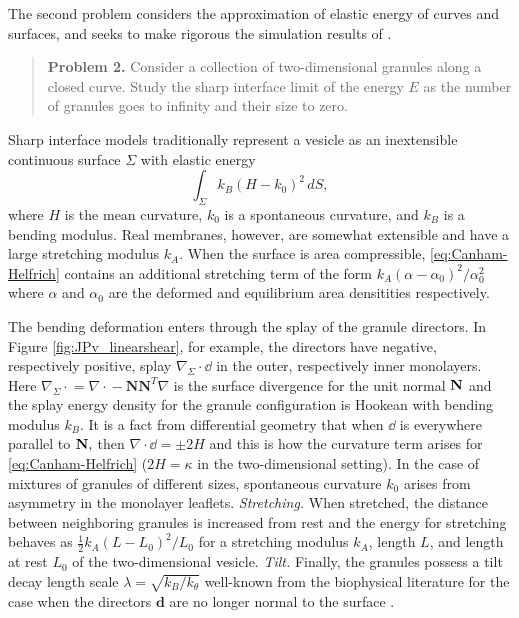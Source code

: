 The second problem considers the approximation
of elastic energy of curves and surfaces,
and seeks to make rigorous the simulation results of
\cite{FuQuRyYo22, Fu2018_SIAM}.
\begin{quotation}
  \textbf{Problem 2.}
  Consider a collection of two-dimensional
  granules along a closed curve. 
  Study the sharp interface limit of the energy $E$ 
  as the number of granules goes to infinity and their size to zero.
\end{quotation}
Sharp interface models
traditionally represent a vesicle as an
inextensible continuous surface $\Sigma$ with elastic energy
\begin{equation}
\label{eq:Canham-Helfrich}
  \int_{\Sigma} k_B(H - k_0)^2\, dS,
\end{equation}
where $H$ is the mean curvature, $k_0$ is a spontaneous curvature,
and $k_B$ is a bending modulus.
Real membranes, however, are somewhat extensible and
have a large stretching modulus $k_A$.
When the surface is area compressible,
\eqref{eq:Canham-Helfrich} contains an additional stretching term of the
form $k_A(\alpha - \alpha_0)^2/\alpha_0^2$ where $\alpha$ and $\alpha_0$ are the
deformed and equilibrium area densitities respectively. 

The bending deformation enters through the splay of the
granule directors.  In Figure \ref{fig:JPv_linearshear},
for example, the directors have negative, respectively positive,
splay $\nabla_{\Sigma} \cdot \dd$
in the outer, respectively inner monolayers.
Here $\nabla_{\Sigma}\cdot{} = \nabla \cdot {} - \mathbf{N}\mathbf{N}^T \nabla$
is the surface divergence for the unit normal $\mathbf{N}$
and the splay energy density
for the granule configuration is Hookean with bending modulus $k_B$.
It is a fact from differential geometry that
when $\dd$ is everywhere parallel to $\mathbf{N},$
then $\nabla\cdot \dd = \pm 2H$ and this is how the
curvature term arises for \eqref{eq:Canham-Helfrich}
($2H = \kappa$ in the two-dimensional setting).
In the case of mixtures of granules of different sizes,
spontaneous curvature $k_0$ arises
from asymmetry in the monolayer leaflets.
\emph{Stretching.}
When stretched, the distance between
neighboring granules is increased from rest
and the energy for stretching behaves as 
$\tfrac{1}{2}k_A(L - L_0)^2/L_0$
for a stretching modulus $k_A$,
length $L$, and
length at rest $L_0$ of the two-dimensional vesicle. 
\emph{Tilt.}
Finally, the granules possess a 
tilt decay length scale $\lambda = \sqrt{k_B/k_{\theta}}$
well-known from the biophysical literature
for the case when the directors $\mathbf{d}$ are no longer normal
to the surface
\cite{KUZMIN2005}.

